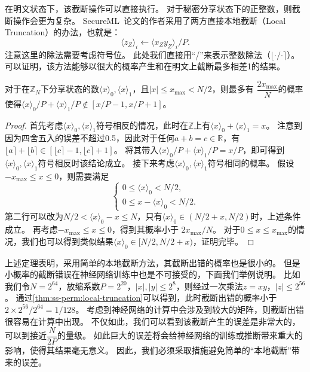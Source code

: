 在明文状态下，该截断操作可以直接执行。
%
对于秘密分享状态下的正整数，则截断操作会更为复杂。
%
SecureML~\cite{mohassel2017secureml}论文的作者采用了两方直接本地截断（Local Truncation）的办法，也就是：
\begin{equation}
    \langle z_Z \rangle_i \gets \langle x_Zy_Z \rangle_i / P.
\end{equation}
%
注意这里的除法需要考虑符号位。
此处我们直接用“/”来表示整数除法（$\lfloor \cdot / \cdot \rceil$）。
%
可以证明，该方法能够以很大的概率产生和在明文上截断最多相差1的结果。

\begin{theorem}[本地截断]
\label{thm:ss-perm:local-truncation}
    对于在$\mathbb Z_N$下分享状态的数$\langle x \rangle_0, \langle x \rangle_1$，且$|x| \le x_\text{max} < N/2$，则最多有
    $\dfrac{2x_\text{max}}{N}$的概率使得$\langle x \rangle_0/P + \langle x \rangle_1/P\notin [x/P - 1, x/P + 1]$。
\end{theorem}
\begin{proof}
    首先考虑$\langle x \rangle_0, \langle x \rangle_1$符号相反的情况，此时在$\mathbb Z$上有$\langle x \rangle_0 + \langle x \rangle_1 = x$。
    注意到因为四舍五入的误差不超过0.5，因此对于任何$a + b = c \in \mathbb R$，有$\lfloor a \rceil + \lfloor b \rceil \in [\lfloor c \rceil - 1, \lfloor c \rceil + 1]$。
    将其带入$\langle x \rangle_0/P + \langle x \rangle_1/P = x/P$，即可得到$\langle x \rangle_0, \langle x \rangle_1$符号相反时该结论成立。
    接下来考虑$\langle x \rangle_0, \langle x \rangle_1$符号相同的概率。
    假设$-x_\text{max} \le x \le 0$，则需要满足 
    \begin{equation}
    \begin{cases}
        0 \le \langle x \rangle_0 < N/2, \\
        0 \le x - \langle x \rangle_0 < N/2.
    \end{cases}
    \end{equation}
    第二行可以改为$N/2 < \langle x \rangle_0 - x \le N$，只有$\langle x \rangle_0 \in (N/2 + x, N/2)$时，上述条件成立。
    再考虑$-x_\text{max} \le x \le 0$，得到其概率小于 $2x_\text{max}/N$。
    对于$0 \le x \le x_\text{max}$的情况，我们也可以得到类似结果$\langle x \rangle_0 \in [N/2, N/2 + x)$，证明完毕。
\end{proof}
%
上述定理表明，采用简单的本地截断方法，其截断出错的概率也是很小的。
%
但是小概率的截断错误在神经网络训练中也是不可接受的，下面我们举例说明。
%
比如我们令$N = 2^{64}$，放缩系数$P = 2^{20}$，$|x|, |y| \le 2^{8}$，则经过一次乘法$z = xy$，$|z| \le 2^{56}$。
%
通过\autoref{thm:ss-perm:local-truncation}可以得到，此时截断出错的概率小于$2 \times 2^{56} / 2^{64} = 1/128$。
%
考虑到神经网络的计算中会涉及到较大的矩阵，则截断出错很容易在计算中出现。
%
不仅如此，我们可以看到该截断产生的误差是非常大的，可以到接近$\dfrac{N}{2P}$的量级。
%
如此巨大的误差将会给神经网络的训练或推断带来重大的影响，使得其结果毫无意义。
%
因此，我们必须采取措施避免简单的“本地截断”带来的误差。


